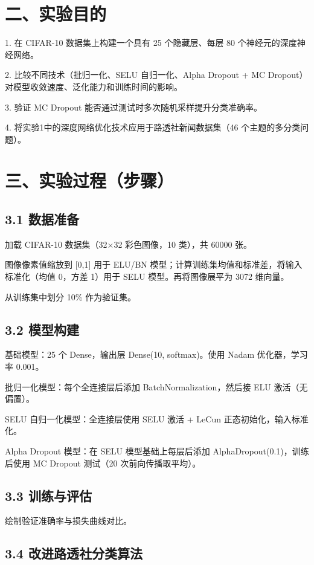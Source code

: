 \documentclass[zihao=-4]{ctexart}  %
\begin{document}
\section*{二、实验目的}
1. 在 CIFAR-10 数据集上构建一个具有 25 个隐藏层、每层 80 个神经元的深度神经网络。

2. 比较不同技术（批归一化、SELU 自归一化、Alpha Dropout + MC Dropout）对模型收敛速度、泛化能力和训练时间的影响。

3. 验证 MC Dropout 能否通过测试时多次随机采样提升分类准确率。

4. 将实验1中的深度网络优化技术应用于路透社新闻数据集（46 个主题的多分类问题）。

\section*{三、实验过程（步骤）}
\subsection*{3.1 数据准备}
加载 CIFAR-10 数据集（32×32 彩色图像，10 类），共 60000 张。

图像像素值缩放到 [0,1] 用于 ELU/BN 模型；计算训练集均值和标准差，将输入标准化（均值 0，方差 1）用于 SELU 模型。再将图像展平为 3072 维向量。

从训练集中划分 10\% 作为验证集。

\subsection*{3.2 模型构建}
基础模型：25 个 Dense，输出层 Dense(10, softmax)。使用 Nadam 优化器，学习率 0.001。

批归一化模型：每个全连接层后添加 BatchNormalization，然后接 ELU 激活（无偏置）。

SELU 自归一化模型：全连接层使用 SELU 激活 + LeCun 正态初始化，输入标准化。

Alpha Dropout 模型：在 SELU 模型基础上每层后添加 AlphaDropout(0.1)，训练后使用 MC Dropout 测试（20 次前向传播取平均）。

\subsection*{3.3 训练与评估}
绘制验证准确率与损失曲线对比。

\subsection*{3.4 改进路透社分类算法}
\end{document}
